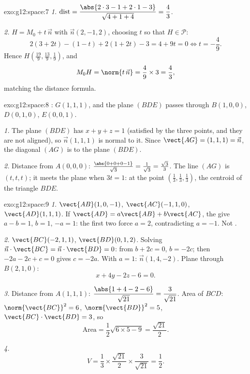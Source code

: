 \begin{solution}{exo:g12:space:7}
\emph{1.} $\operatorname{dist} = \dfrac{\abs{2\cdot3 - 1 + 2\cdot1 - 3}}
{\sqrt{4 + 1 + 4}} = \dfrac{4}{3}$.

\emph{2.} $H = M_0 + t\,\vec n$ with $\vec n(2, -1, 2)$, choosing $t$ so
that $H \in \mathcal P$:
\[
2(3 + 2t) - (1 - t) + 2(1 + 2t) - 3 = 4 + 9t = 0 \iff t = -\frac49 .
\]
Hence $H\left(\frac{19}{9}, \frac{13}{9}, \frac19\right)$, and
\[
M_0H = \norm{t\,\vec n} = \frac49 \times 3 = \frac43,
\]
matching the distance formula.
\end{solution}

\begin{solution}{exo:g12:space:8}
: $G(1,1,1)$, and the plane $(BDE)$ passes through $B(1,0,0)$,
$D(0,1,0)$, $E(0,0,1)$.

\emph{1.} The plane $(BDE)$ has  $x + y + z = 1$ (satisfied by the
three points, and they are not aligned), so $\vec n(1,1,1)$ is normal to
it. Since $\vect{AG} = (1,1,1) = \vec n$, the diagonal $(AG)$ is 
to the plane $(BDE)$.

\emph{2.} Distance from $A(0,0,0)$:
$\frac{\abs{0 + 0 + 0 - 1}}{\sqrt3} = \frac{1}{\sqrt3} = \frac{\sqrt3}{3}$.
The line $(AG)$ is $(t, t, t)$; it meets the plane when $3t = 1$: at the
point $\left(\frac13, \frac13, \frac13\right)$, the centroid of the
triangle $BDE$.
\end{solution}

\begin{solution}{exo:g12:space:9}
\emph{1.} $\vect{AB}(1, 0, -1)$, $\vect{AC}(-1, 1, 0)$,
$\vect{AD}(1, 1, 1)$. If $\vect{AD} = a\vect{AB} + b\vect{AC}$, the
 give $a - b = 1$, $b = 1$, $-a = 1$: the first two force
$a = 2$, contradicting $a = -1$. Not .

\emph{2.} $\vect{BC}(-2, 1, 1)$, $\vect{BD}(0, 1, 2)$. Solving
$\vec n \cdot \vect{BC} = \vec n \cdot \vect{BD} = 0$: from
$b + 2c = 0$, $b = -2c$; then $-2a - 2c + c = 0$ gives $c = -2a$. With
$a = 1$: $\vec n(1, 4, -2)$. Plane through $B(2,1,0)$:
\[
x + 4y - 2z - 6 = 0 .
\]

\emph{3.} Distance from $A(1,1,1)$:
$\dfrac{\abs{1 + 4 - 2 - 6}}{\sqrt{21}} = \dfrac{3}{\sqrt{21}}$.
Area of $BCD$: $\norm{\vect{BC}}^2 = 6$, $\norm{\vect{BD}}^2 = 5$,
$\vect{BC}\cdot\vect{BD} = 3$, so
\[
\text{Area} = \frac12\sqrt{6 \times 5 - 9} = \frac{\sqrt{21}}{2}.
\]

\emph{4.}
\[
V = \frac13 \times \frac{\sqrt{21}}{2} \times \frac{3}{\sqrt{21}}
= \frac12 .
\]
\end{solution}

